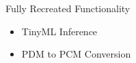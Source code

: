 




\begin{frame}{Fully Recreated Functionality}
    \begin{itemize}
        \item TinyML Inference
        \item PDM to PCM Conversion
    \end{itemize}    
\end{frame}

